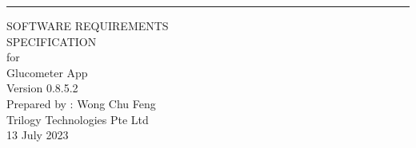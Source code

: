 \documentclass[a4paper]{scrreprt}
\date{}
\def\myversion{0.8.5.2 }
\begin{document}
\thispagestyle{currentpagefooter}

\begin{flushright}
    \rule{16cm}{5pt}\vskip1cm
    \begin{bfseries}
        \Huge{SOFTWARE REQUIREMENTS\\ SPECIFICATION}\\
        \vspace{2.5cm}
        for\\
        \vspace{1.5cm}
        Glucometer App\\
        \vspace{2cm}
        \LARGE{Version \myversion}\\
        \vspace{1.5cm}
        Prepared by : Wong Chu Feng\\
        \vspace{1.5cm}
        Trilogy Technologies Pte Ltd\\
        \vspace{1.5cm}
        13 July 2023\\
    \end{bfseries}
\end{flushright}
\end{document}
